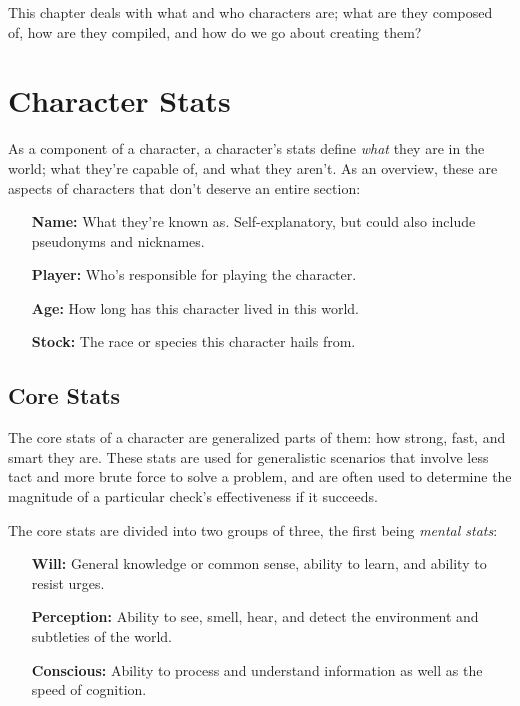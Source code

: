 \documentclass[../main.tex]{subfiles}
\begin{document}
    This chapter deals with what and who characters are; what are they composed of, how are they compiled, and how do we go about creating them? 

    \section{Character Stats}

        As a component of a character, a character's stats define \emph{what} they are in the world; what they're capable of, and what they aren't. As an overview, these are aspects of characters that don't deserve an entire section:

        \begin{itemize}
            \item [\textbf{Name:}] What they're known as. Self-explanatory, but could also include pseudonyms and nicknames.
            \item [\textbf{Player:}] Who's responsible for playing the character.
            \item [\textbf{Age:}] How long has this character lived in this world.
            \item [\textbf{Stock:}] The race or species this character hails from.
        \end{itemize}

    \subsection{Core Stats}

        The core stats of a character are generalized parts of them: how strong, fast, and smart they are. These stats are used for generalistic scenarios that involve less tact and more brute force to solve a problem, and are often used to determine the magnitude of a particular check's effectiveness if it succeeds.

        The core stats are divided into two groups of three, the first being \emph{mental stats}:

    \begin{itemize}
        \item [\textbf{Will:}] General knowledge or common sense, ability to learn, and ability to resist urges. 
        \item [\textbf{Perception:}] Ability to see, smell, hear, and detect the environment and subtleties of the world.
        \item [\textbf{Conscious:}] Ability to process and understand information as well as the speed of cognition.
    \end{itemize}
\end{document}
